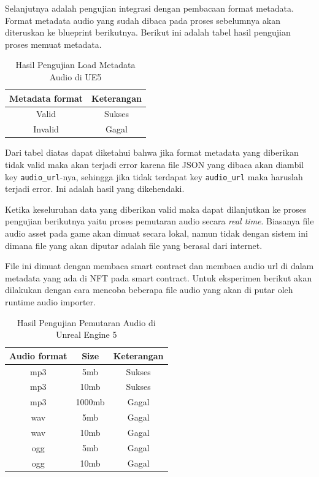 Selanjutnya adalah pengujian integrasi dengan pembacaan format metadata. Format metadata audio yang sudah dibaca pada proses sebelumnya akan diteruskan ke blueprint berikutnya.
Berikut ini adalah tabel hasil pengujian proses memuat metadata.

\begin{longtable}{|c|c|}
  \caption{Hasil Pengujian Load Metadata Audio di UE5}
  \label{tb:UjiIntegrasiPengujianLoadMetadataAudio} \\
  \hline
  \rowcolor[HTML]{C0C0C0}
  \textbf{Metadata format} & \textbf{Keterangan}    \\
  \hline
  Valid                    & Sukses                 \\
  Invalid                  & Gagal                  \\
  \hline
\end{longtable}

Dari tabel diatas dapat diketahui bahwa jika format metadata yang diberikan tidak valid maka akan terjadi error karena file JSON yang dibaca
akan diambil key \texttt{audio\_url}-nya, sehingga jika tidak terdapat key \texttt{audio\_url} maka haruslah terjadi error. Ini adalah hasil yang dikehendaki.

Ketika keseluruhan data yang diberikan valid maka dapat dilanjutkan ke proses pengujian berikutnya yaitu proses pemutaran audio secara \emph{real time}.
Biasanya file audio asset pada game akan dimuat secara lokal, namun tidak dengan sistem ini dimana file yang akan diputar adalah file yang berasal dari internet.

File ini dimuat dengan membaca smart contract dan membaca audio url di dalam metadata yang ada di NFT pada smart contract. Untuk eksperimen berikut akan dilakukan
dengan cara mencoba beberapa file audio yang akan di putar oleh runtime audio importer.

\begin{longtable}{|c|c|c|}
  \caption{Hasil Pengujian Pemutaran Audio di Unreal Engine 5}
  \label{tb:UjiIntegrasiPemutaranAudio}                       \\
  \hline
  \rowcolor[HTML]{C0C0C0}
  \textbf{Audio format} & \textbf{Size} & \textbf{Keterangan} \\
  \hline
  mp3                   & 5mb           & Sukses              \\
  mp3                   & 10mb          & Sukses              \\
  mp3                   & 1000mb        & Gagal               \\
  wav                   & 5mb           & Gagal               \\
  wav                   & 10mb          & Gagal               \\
  ogg                   & 5mb           & Gagal               \\
  ogg                   & 10mb          & Gagal               \\
  \hline
\end{longtable}

